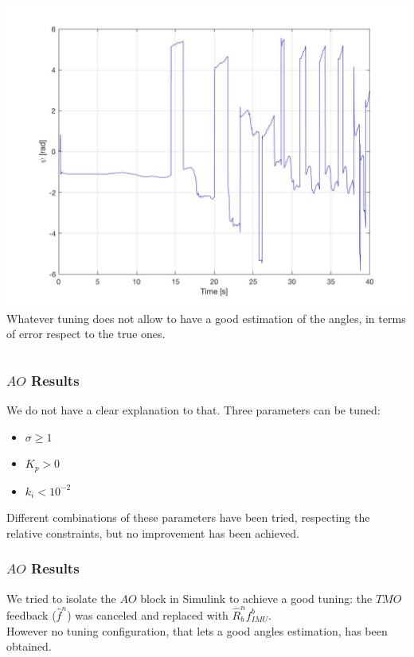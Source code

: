 \documentclass{beamer}
\begin{document}
\begin{frame}
\begin{columns}[t]
			\includegraphics[scale= 0.12]{psi_angle.jpg}\\
			\vspace{0.4cm}
			Whatever tuning does not allow to have a good estimation of the angles, in terms of error respect to the true ones.
		\end{columns}
	\end{frame}
	
	\begin{frame}
		\frametitle{$AO$ Results}
		We do not have a clear explanation to that. Three parameters can be tuned:
		\begin{itemize}
			\item $\sigma \geq 1$ 
			\item $K_p > 0$
			\item $k_i < 10^{-2}$
		\end{itemize}
		Different combinations of these parameters have been tried, respecting the relative constraints, but no improvement has been achieved.
	\end{frame}
	
	\begin{frame}
		\frametitle{$AO$ Results}
		We tried to isolate the $AO$ block in Simulink to achieve a good tuning: the $TMO$ feedback ($\hat{f}^n$) was canceled and replaced with $\hat{R}^n_b f^b_{IMU}$. \\
		\vspace{0.3cm}
		However no tuning configuration, that lets a good angles estimation, has been obtained.
	\end{frame}
	
\end{document}
